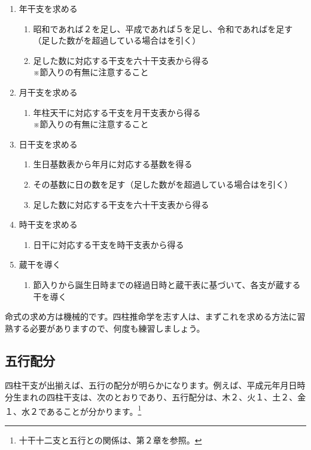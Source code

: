 \documentclass[a5paper,11pt,dvipdfmx]{tarticle}
\begin{document}
\begin{enumerate}
  \item 年干支を求める
  \begin{enumerate}
  \item 昭和であれば２を足し、平成であれば５を足し、令和であればを足す（足した数がを超過している場合はを引く）
  \item 足した数に対応する干支を六十干支表から得る\\
    ※節入りの有無に注意すること
  \end{enumerate}
\item 月干支を求める
  \begin{enumerate}
  \item 年柱天干に対応する干支を月干支表から得る\\
    ※節入りの有無に注意すること
  \end{enumerate}
  \item 日干支を求める
    \begin{enumerate}
    \item 生日基数表から年月に対応する基数を得る
    \item その基数に日の数を足す（足した数がを超過している場合はを引く）
    \item 足した数に対応する干支を六十干支表から得る
    \end{enumerate}
  \item 時干支を求める
    \begin{enumerate}
    \item 日干に対応する干支を時干支表から得る
    \end{enumerate}
  \item 蔵干を導く
    \begin{enumerate}
    \item 節入りから誕生日時までの経過日時と蔵干表に基づいて、各支が蔵する干を導く
    \end{enumerate}
  \end{enumerate}

命式の求め方は機械的です。四柱推命学を志す人は、まずこれを求める方法に習熟する必要がありますので、何度も練習しましょう。

\subsection{五行配分}
四柱干支が出揃えば、五行の配分が明らかになります。例えば、平成元年月日時分生まれの四柱干支は、次のとおりであり、五行配分は、木２、火１、土２、金１、水２であることが分かります。\footnote{十干十二支と五行との関係は、第２章を参照。}
\end{document}
